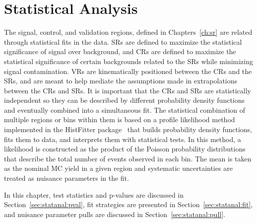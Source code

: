 \chapter{Statistical Analysis}
\label{ch:statanal} 
The signal, control, and validation regions, defined in Chapters~\ref{ch:sr} are related through statistical fits in the data.  SRs are defined to maximize the statistical significance of signal over background, and CRs are defined to maximize the statistical significance of certain backgrounds related to the SRs while minimizing signal contamination.  VRs are kinematically positioned between the CRs and the SRs, and are meant to help mediate the assumptions made in extrapolations between the CRs and SRs.  It is important that the CRs and SRs are statistically independent so they can be described by different probability density functions and eventually combined into a simultaneous fit. The statistical combination of multiple regions or bins within them is based on a profile likelihood method implemented in the HistFitter package~\cite{baak} that builds probability density functions, fits them to data, and interprets them with statistical tests.  In this method, a likelihood is constructed as the product of the Poisson probability distributions that describe the total number of events observed in each bin.  The mean is taken as the nominal MC yield in a given region and systematic uncertainties are treated as nuisance parameters in the fit.  

In this chapter, test statistics and p-values are discussed in Section~\ref{sec:statanal:pval}, fit strategies are presented in Section~\ref{sec:statanal:fit}, and nuisance parameter pulls are discussed in Section~\ref{sec:statanal:pull}.


